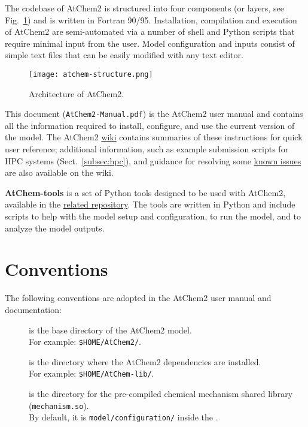The codebase of AtChem2 is structured into four components (or layers,
see Fig.~\ref{fig:atchem-arch}) and is written in Fortran 90/95.
Installation, compilation and execution of AtChem2 are semi-automated
via a number of shell and Python scripts that require minimal input
from the user. Model configuration and inputs consist of simple text
files that can be easily modified with any text editor.

\begin{figure}[htb]
  \centering
  \texttt{[image: atchem-structure.png]}
  \caption{Architecture of AtChem2.}
  \label{fig:atchem-arch}
\end{figure}

This document (\texttt{AtChem2-Manual.pdf}) is the AtChem2 user manual
and contains all the information required to install, configure, and
use the current version of the model. The AtChem2
\href{https://github.com/AtChem/AtChem2/wiki}{wiki} contains summaries
of these instructions for quick user reference; additional
information, such as example submission scripts for HPC systems
(Sect.~\ref{subsec:hpc}), and guidance for resolving some
\underline{known issues} are also available on the wiki.

\textbf{AtChem-tools} is a set of Python tools designed to be used with AtChem2,
available in the \href{https://github.com/AtChem/AtChem-tools}{related repository}.
The tools are written in Python and include scripts to help with the model setup 
and configuration, to run the model, and to analyze the model outputs.

\section{Conventions} \label{sec:conventions}

The following conventions are adopted in the AtChem2 user manual and
documentation:

\begin{description}
\item[\maindir] is the base directory of the AtChem2 model.\\
  For example: \texttt{\$HOME/AtChem2/}.
\item[\depdir] is the directory where the AtChem2 dependencies are installed.\\
  For example: \texttt{\$HOME/AtChem-lib/}.
\item[\sharedir] is the directory for the pre-compiled chemical
  mechanism shared library (\texttt{mechanism.so}).\\
  By default, it is \texttt{model/configuration/} inside the \maindir.
\end{description}

